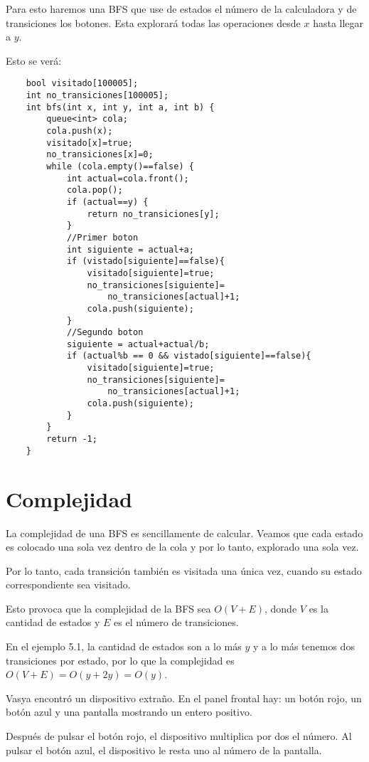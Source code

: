 Para esto haremos una BFS que use de estados el número de la calculadora y de transiciones los botones. Esta explorará todas las operaciones desde \(x\) hasta llegar a \(y\).

Esto se verá:

\pagebreak

\begin{lstlisting}
	bool visitado[100005];
	int no_transiciones[100005];
	int bfs(int x, int y, int a, int b) {
		queue<int> cola;
		cola.push(x);
		visitado[x]=true;
		no_transiciones[x]=0;		
		while (cola.empty()==false) {
			int actual=cola.front();
			cola.pop();
			if (actual==y) {
				return no_transiciones[y];
			}	
			//Primer boton
			int siguiente = actual+a;
			if (vistado[siguiente]==false){
				visitado[siguiente]=true;
				no_transiciones[siguiente]=
					no_transiciones[actual]+1;
				cola.push(siguiente);
			}
			//Segundo boton
			siguiente = actual+actual/b;
			if (actual%b == 0 && vistado[siguiente]==false){
				visitado[siguiente]=true;
				no_transiciones[siguiente]=
					no_transiciones[actual]+1;
				cola.push(siguiente);
			}
		}
		return -1;
	}
\end{lstlisting}



\section*{Complejidad}
La complejidad de una BFS es sencillamente de calcular. Veamos que cada estado es colocado una sola vez dentro de la cola y por lo tanto, explorado una sola vez.

Por lo tanto, cada transición también es visitada una única vez, cuando su estado correspondiente sea visitado.

Esto provoca que la complejidad de la BFS sea \(O(V+E)\), donde \(V\) es la cantidad de estados y \(E\) es el número de transiciones.

En el ejemplo 5.1, la cantidad de estados son a lo más \(y\) y a lo más tenemos dos transiciones por estado, por lo que la complejidad es \(O(V+E)=O(y+2y)=O(y)\).

\newpage


\problemtitle Vasya encontró un dispositivo extraño. En el panel frontal hay: un botón rojo, un botón azul y una pantalla mostrando un entero positivo. 

Después de pulsar el botón rojo, el dispositivo multiplica por dos el número. Al pulsar el botón azul, el dispositivo le resta uno al número de la pantalla. 

